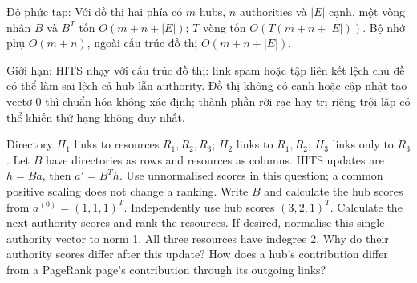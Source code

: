 \documentclass[10pt,a4paper,twocolumn]{article}
\newcommand{\key}[1]{#1:\enspace}
\begin{document}
\key{Độ phức tạp} Với đồ thị hai phía có $m$ hubs, $n$ authorities và $|E|$ cạnh, một vòng nhân $B$ và $B^T$ tốn $O(m+n+|E|)$; $T$ vòng tốn $O(T(m+n+|E|))$. Bộ nhớ phụ $O(m+n)$, ngoài cấu trúc đồ thị $O(m+n+|E|)$.

\key{Giới hạn} HITS nhạy với cấu trúc đồ thị: link spam hoặc tập liên kết lệch chủ đề có thể làm sai lệch cả hub lẫn authority. Đồ thị không có cạnh hoặc cập nhật tạo vectơ 0 thì chuẩn hóa không xác định; thành phần rời rạc hay trị riêng trội lặp có thể khiến thứ hạng không duy nhất.


Directory $H_1$ links to resources $R_1,R_2,R_3$; $H_2$ links to $R_1,R_2$; $H_3$ links only to $R_3$. Let $B$ have directories as rows and resources as columns. HITS updates are $h=Ba$, then $a'=B^Th$. Use unnormalised scores in this question; a common positive scaling does not change a ranking.
 Write $B$ and calculate the hub scores from $a^{(0)}=(1,1,1)^T$.
 Independently use hub scores $(3,2,1)^T$. Calculate the next authority scores and rank the resources. If desired, normalise this single authority vector to norm 1.
 All three resources have indegree 2. Why do their authority scores differ after this update? How does a hub's contribution differ from a PageRank page's contribution through its outgoing links?
\end{document}

